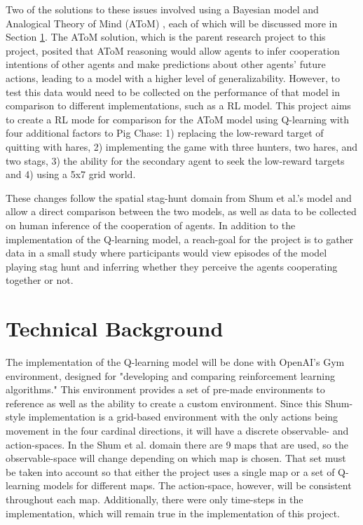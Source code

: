\documentclass[10pt,twocolumn]{article}
\begin{document}
Two of the solutions to these issues involved using a Bayesian model \cite{Shum2019} and Analogical Theory of Mind (AToM) \cite{Rabkina2019}, each of which will be discussed more in Section \ref{SectionTB}.
The AToM solution, which is the parent research project to this project, posited that AToM reasoning would allow agents to infer cooperation intentions of other agents and make predictions about other agents' future actions, leading to a model with a higher level of generalizability.
However, to test this data would need to be collected on the performance of that model in comparison to different implementations, such as a RL model.
This project aims to create a RL mode for comparison for the AToM model using Q-learning with four additional factors to Pig Chase: 1) replacing the low-reward target of quitting with hares, 2) implementing the game with three hunters, two hares, and two stags, 3) the ability for the secondary agent to seek the low-reward targets and 4) using a 5x7 grid world.

These changes follow the spatial stag-hunt domain from Shum et al.'s model and allow a direct comparison between the two models, as well as data to be collected on human inference of the cooperation of agents.
In addition to the implementation of the Q-learning model, a reach-goal for the project is to gather data in a small study where participants would view episodes of the model playing stag hunt and inferring whether they perceive the agents cooperating together or not.

\section{Technical Background}
\label{SectionTB}

The implementation of the Q-learning model will be done with OpenAI's Gym environment, designed for "developing and comparing reinforcement learning algorithms." \cite{GymDocs, Brockman2016}
This environment provides a set of pre-made environments to reference as well as the ability to create a custom environment.
Since this Shum-style implementation is a grid-based environment with the only actions being movement in the four cardinal directions, it will have a discrete observable- and action-spaces.
In the Shum et al. domain there are 9 maps that are used, so the observable-space will change depending on which map is chosen.
That set must be taken into account so that either the project uses a single map or a set of Q-learning models for different maps.
The action-space, however, will be consistent throughout each map.
Additionally, there were only time-steps in the implementation, which will remain true in the implementation of this project.
\end{document}
